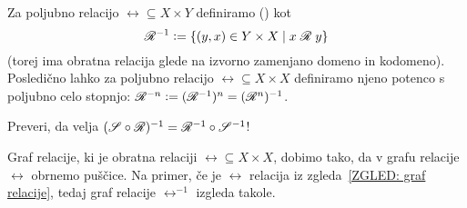                 Za poljubno relacijo $\rel \subseteq X \times Y$ definiramo  ()  kot
                \[\rel^{-1} \dfeq \set{(y, x) \in Y \times X}{\rel[x][y]}\]
                (torej ima obratna relacija glede na izvorno zamenjano domeno in kodomeno). Posledično lahko za poljubno relacijo $\rel \subseteq X \times X$ definiramo njeno potenco s poljubno celo stopnjo: $\rel^{-n} \dfeq (\rel^{-1})^n = (\rel^n)^{-1}$.

                \begin{vaja}
                        Preveri, da velja $(\srel \circ \rel)^{-1} = \rel^{-1} \circ \srel^{-1}$!
                \end{vaja}

                \begin{zgled}
                        Graf relacije, ki je obratna relaciji $\rel \subseteq X \times X$, dobimo tako, da v grafu relacije $\rel$ obrnemo puščice. Na primer, če je $\rel$ relacija iz zgleda~\ref{ZGLED: graf relacije}, tedaj graf relacije $\rel^{-1}$ izgleda takole.

                \end{zgled}

